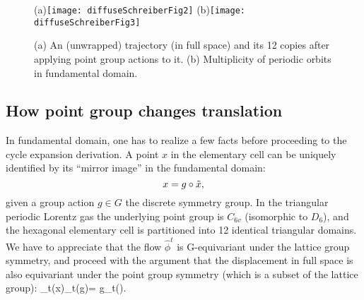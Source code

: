 \documentclass[aps,pre,
                showpacs,
                twocolumn,
                groupedaddress,
                floatfix]{revtex4-1}
\begin{document}
\begin{figure}[htbp]
  \begin{center}
    (a)\texttt{[image: diffuseSchreiberFig2]}
    (b)\texttt{[image: diffuseSchreiberFig3]}
  \end{center}
  \caption[]{ \label{fig:schrieberFig23} (a) An (unwrapped) trajectory (in full
  space) and its 12 copies after applying point group actions to it. (b)
  Multiplicity of periodic orbits in fundamental domain.}
\end{figure}

\subsection{How point group changes translation}


In fundamental domain, one has to realize a few facts before proceeding to the
cycle expansion derivation. A point $x$ in the elementary cell can be uniquely
identified by its ``mirror image'' in the fundamental domain:
\[
x=g\circ\tilde x,
\]
given a group action $g\in G$ the discrete symmetry group. In the triangular
periodic Lorentz gas the underlying point group is $C_{6v}$ (isomorphic to
$D_6$), and the hexagonal elementary cell is partitioned into 12 identical
triangular domains. We have to appreciate that the flow $\hat{\phi}^t$ is
G-equivariant under the lattice group symmetry, and proceed with the argument
that the displacement in full space is also equivariant under the point group
symmetry (which is a subset of the lattice group):
\beq 
\hn_t(x)\equiv\hn_t(g\circ\tx)= g\circ\hn_t(\tx). 
\eeq
\end{document}
